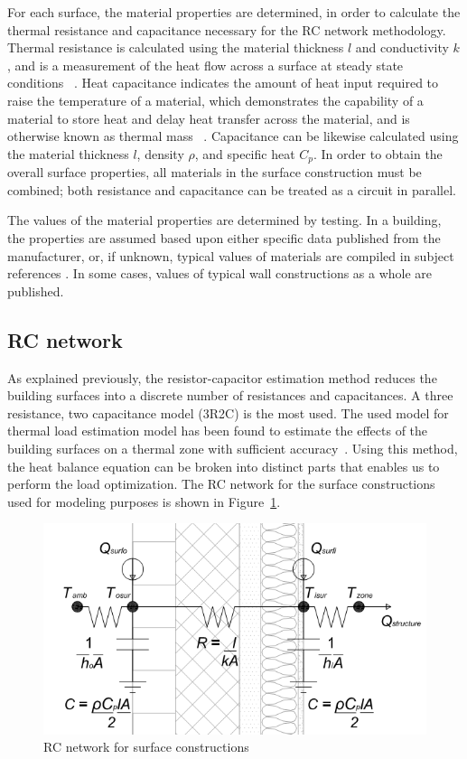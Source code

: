 For each surface, the material properties are determined, in order to calculate the thermal resistance and capacitance necessary for the RC network methodology.  Thermal resistance is calculated using the material thickness $l$ and conductivity $k$, and is a measurement of the heat flow across a surface at steady state conditions ~\citep{american90}.  Heat capacitance indicates the amount of heat input required to raise the temperature of a material, which demonstrates the capability of a material to store heat and delay heat transfer across the material, and is otherwise known as thermal mass ~\citep{american90}.  Capacitance can be likewise calculated using the material thickness $l$, density $\rho$, and specific heat $C_p$.  In order to obtain the overall surface properties, all materials in the surface construction must be combined; both resistance and capacitance can be treated as a circuit in parallel.

The values of the material properties are determined by testing.  In a building, the properties are assumed based upon either specific data published from the manufacturer, or, if unknown, typical values of materials are compiled in subject references \citep{american20132013}.  In some cases, values of typical wall constructions as a whole are published. 

\subsection{RC network}
\label{building_method}

As explained previously, the resistor-capacitor estimation method reduces the building surfaces into a discrete number of resistances and capacitances.  A three resistance, two capacitance model (3R2C) is the most used.  The used model for thermal load estimation model has been found to estimate the effects of the building surfaces on a thermal zone with sufficient accuracy~\citep{kircher2015lumped}.  Using this method, the heat balance equation can be broken into distinct parts that enables us to perform the load optimization.  The RC network for the surface constructions used for modeling purposes is shown in Figure~\ref{rc_walls}.

\begin{figure}[H]
\centering
\includegraphics[scale=0.4]{jbs_figures/RC}
\caption{RC network for surface constructions}
\label{rc_walls}
\end{figure}

